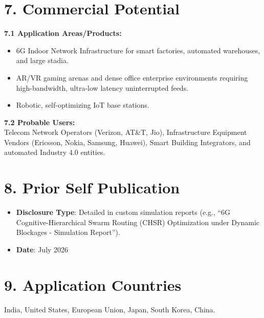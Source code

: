\documentclass[11pt, a4paper]{article}
\begin{document}
\section*{7. Commercial Potential}
\textbf{7.1 Application Areas/Products:}
\begin{itemize}
    \item 6G Indoor Network Infrastructure for smart factories, automated warehouses, and large stadia.
    \item AR/VR gaming arenas and dense office enterprise environments requiring high-bandwidth, ultra-low latency uninterrupted feeds.
    \item Robotic, self-optimizing IoT base stations.
\end{itemize}

\noindent\textbf{7.2 Probable Users:} \\
Telecom Network Operators (Verizon, AT\&T, Jio), Infrastructure Equipment Vendors (Ericsson, Nokia, Samsung, Huawei), Smart Building Integrators, and automated Industry 4.0 entities.

\section*{8. Prior Self Publication}
\begin{itemize}
    \item \textbf{Disclosure Type}: Detailed in custom simulation reports (e.g., ``6G Cognitive-Hierarchical Swarm Routing (CHSR) Optimization under Dynamic Blockages - Simulation Report'').
    \item \textbf{Date}: July 2026
\end{itemize}

\section*{9. Application Countries}
India, United States, European Union, Japan, South Korea, China.
\end{document}
